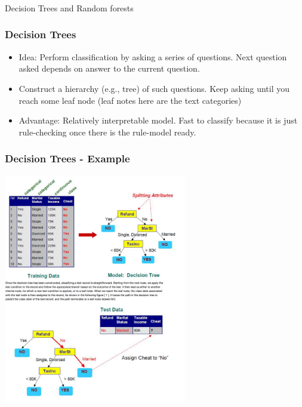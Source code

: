 \documentclass{beamer}
\begin{document}
\begin{frame}
\frametitle{}
\Large Decision Trees and Random forests
\end{frame}

\begin{frame}
\frametitle{Decision Trees}
\begin{itemize}
\item Idea: Perform classification by asking a series of questions. Next question asked depends on answer to the current question.
\item Construct a hierarchy (e.g., tree) of such questions. Keep asking until you reach some leaf node (leaf notes here are the text categories)
\item Advantage: Relatively interpretable model. Fast to classify because it is just rule-checking once there is the rule-model ready.
\end{itemize}
\end{frame}

\begin{frame}
\frametitle{Decision Trees - Example}
\begin{center}
\includegraphics[width=0.6\textwidth]{DT-Example.png}
\end{center}
\end{frame}
\end{document}
